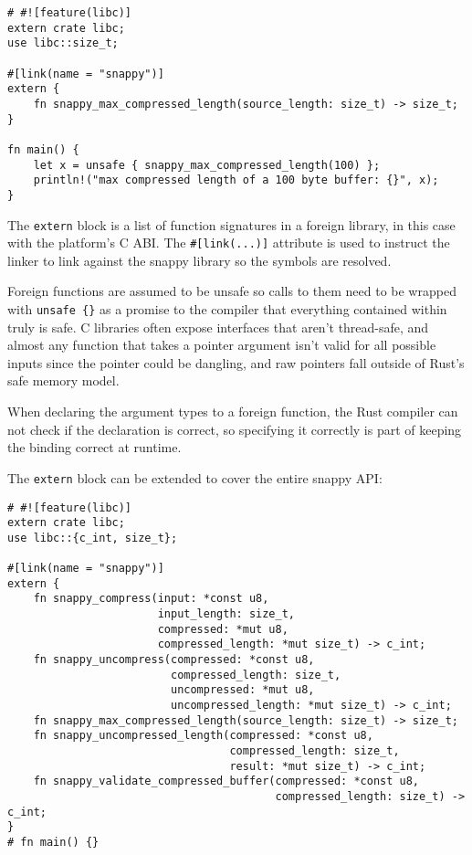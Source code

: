 \documentclass[a4paper,]{book}
\begin{document}
\begin{verbatim}
# #![feature(libc)]
extern crate libc;
use libc::size_t;

#[link(name = "snappy")]
extern {
    fn snappy_max_compressed_length(source_length: size_t) -> size_t;
}

fn main() {
    let x = unsafe { snappy_max_compressed_length(100) };
    println!("max compressed length of a 100 byte buffer: {}", x);
}
\end{verbatim}

The \texttt{extern} block is a list of function signatures in a foreign
library, in this case with the platform's C ABI. The
\texttt{\#{[}link(...){]}} attribute is used to instruct the linker to
link against the snappy library so the symbols are resolved.

Foreign functions are assumed to be unsafe so calls to them need to be
wrapped with \texttt{unsafe\ \{\}} as a promise to the compiler that
everything contained within truly is safe. C libraries often expose
interfaces that aren't thread-safe, and almost any function that takes a
pointer argument isn't valid for all possible inputs since the pointer
could be dangling, and raw pointers fall outside of Rust's safe memory
model.

When declaring the argument types to a foreign function, the Rust
compiler can not check if the declaration is correct, so specifying it
correctly is part of keeping the binding correct at runtime.

The \texttt{extern} block can be extended to cover the entire snappy
API:

\begin{verbatim}
# #![feature(libc)]
extern crate libc;
use libc::{c_int, size_t};

#[link(name = "snappy")]
extern {
    fn snappy_compress(input: *const u8,
                       input_length: size_t,
                       compressed: *mut u8,
                       compressed_length: *mut size_t) -> c_int;
    fn snappy_uncompress(compressed: *const u8,
                         compressed_length: size_t,
                         uncompressed: *mut u8,
                         uncompressed_length: *mut size_t) -> c_int;
    fn snappy_max_compressed_length(source_length: size_t) -> size_t;
    fn snappy_uncompressed_length(compressed: *const u8,
                                  compressed_length: size_t,
                                  result: *mut size_t) -> c_int;
    fn snappy_validate_compressed_buffer(compressed: *const u8,
                                         compressed_length: size_t) -> c_int;
}
# fn main() {}
\end{verbatim}
\end{document}
